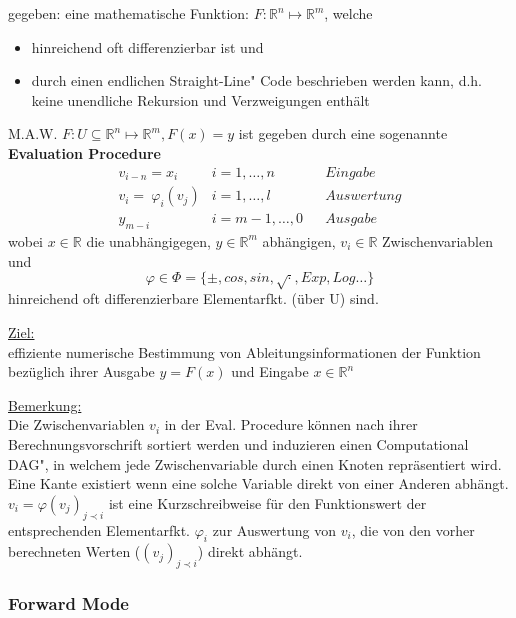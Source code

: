 gegeben: eine mathematische Funktion: $F:\mathbb{R}^n\mapsto\mathbb{R}^m$, welche
\begin{itemize}
	\item hinreichend oft differenzierbar ist und
	\item durch einen endlichen \glqq Straight-Line" Code beschrieben werden kann, d.h. keine unendliche Rekursion und Verzweigungen enthält
\end{itemize}
M.A.W. $F:U\subseteq \mathbb{R}^n\mapsto\mathbb{R}^m, F(x) = y$ ist gegeben durch eine sogenannte
\textbf{Evaluation Procedure}
\begin{align*}
	v_{i-n}= x_i & i = 1,\dots,n && Eingabe\\
	v_i = \ \varphi_i(v_j) & i = 1,\dots,l && Auswertung\\
	y_{m-i}& i = m-1,\dots,0 && Ausgabe
\end{align*}
wobei $x \in \mathbb{R}$ die unabhängigegen, $y \in \mathbb{R}^m$ abhängigen, $v_i \in \mathbb{R}$ Zwischenvariablen und 
$$\varphi \in \Phi = \{\pm, cos, sin, \sqrt{\cdot}, Exp, Log \dots \}$$
hinreichend oft differenzierbare Elementarfkt. (über U) sind.

\vspace{\baselineskip}
\noindent
\underline{Ziel:}\\
effiziente numerische Bestimmung von Ableitungsinformationen der Funktion bezüglich ihrer Ausgabe $y=F(x)$ und Eingabe $x \in \mathbb{R}^n$
\vspace{\baselineskip}

\noindent
\underline{Bemerkung:}\\
Die Zwischenvariablen $v_i$ in der Eval. Procedure können nach ihrer Berechnungsvorschrift sortiert werden und induzieren einen \glqq Computational DAG", in welchem jede Zwischenvariable durch einen Knoten repräsentiert wird. Eine Kante existiert wenn eine solche Variable direkt von einer Anderen abhängt.\\

\noindent
$v_i = \varphi(v_j)_{j \prec i}$ ist eine Kurzschreibweise für den Funktionswert der entsprechenden Elementarfkt. $\varphi_i$ zur Auswertung von $v_i$, die von den vorher berechneten Werten ($(v_j)_{j \prec i}$) direkt abhängt.

\vspace{\baselineskip}

\subsubsection{Forward Mode}
\label{subsubsec:FM}


